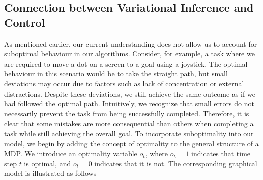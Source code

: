 \subsection{Connection between Variational Inference and Control}
As mentioned earlier, our current understanding does not allow us to account for suboptimal behaviour in our algorithms. Consider, for 
example, a task where we are required to move a dot on a screen to a goal using a joystick. The optimal behaviour in this scenario would
be to take the straight path, but small deviations may occur due to factors such as lack of concentration or external distractions. Despite
these deviations, we still achieve the same outcome as if we had followed the optimal path. Intuitively, we recognize that small errors do 
not necessarily prevent the task from being successfully completed. Therefore, it is clear that some mistakes are more consequential than 
others when completing a task while still achieving the overall goal.\newline
To incorporate suboptimality into our model, we begin by adding the concept of optimality to the general structure of a MDP. We introduce an 
optimality variable $o_t$, where $o_t = 1$ indicates that time step $t$ is optimal, and $o_t = 0$ indicates that it is not. The corresponding 
graphical model is illustrated as follows
\begin{figure}[H]
    \centering
{}

\end{figure}
